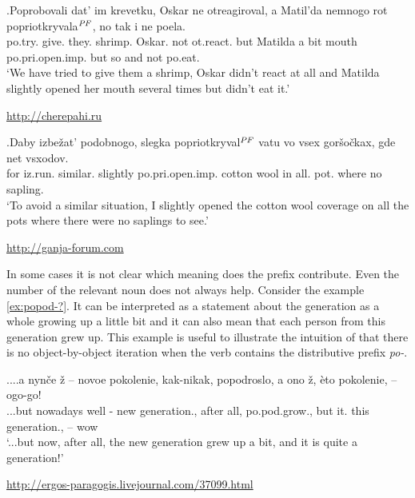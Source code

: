 \exg.\label{ex:popriotkryval:pf1}Poprobovali dat' im krevetku, Oskar ne otreagiroval, a Matil'da nemnogo rot popriotkryvala$^{\mathit{PF}}$, no tak i ne poela.\\
po.try. give. they. shrimp. Oskar. not ot.react. but Matilda {a bit} mouth po.pri.open.imp. but so and not po.eat.\\
\vspace{0.5em}
`We have tried to give them a shrimp, Oskar didn't react at all and Matilda slightly opened her mouth several times but didn't eat it.'
\begin{flushright}
\vspace{-0.5em}
\url{http://cherepahi.ru}
\end{flushright}

\exg.\label{ex:popriotkryval:pf2}Daby izbe\v{z}at' podobnogo, slegka popriotkryval$^{\mathit{PF}}$ vatu vo vsex gor\v{s}o\v{c}kax, gde net vsxodov.\\
for iz.run. similar. slightly po.pri.open.imp. {cotton wool} in all. pot. where no sapling.\\
\vspace{0.5em}
`To avoid a similar situation, I slightly opened the cotton wool coverage on all the pots where there were no saplings to see.'
\begin{flushright}
\vspace{-0.5em}
\url{http://ganja-forum.com}
\end{flushright}

In some cases it is not clear which meaning does the prefix contribute. Even the number of the relevant noun does not always help. Consider the example \ref{ex:popod-?}. It can be interpreted as a statement about the generation as a whole growing up a little bit and it can also mean that each person from this generation grew up. This example is useful to illustrate the intuition of \citet{Isachenko:60} that there is no object-by-object iteration when the verb contains the distributive prefix \textit{po-}.

\exg.\label{ex:popod-?}...a nyn\v{c}e \v{z} – novoe pokolenie, kak-nikak, popodroslo, a ono \v{z}, \`{e}to pokolenie, -- ogo-go!\\
...but nowadays well - new generation., {after all}, po.pod.grow., but it. {} this generation., -- wow
\\
\vspace{0.5em}
`...but now, after all, the new generation grew up a bit, and it is quite a generation!'
\begin{flushright}
\vspace{-0.5em}
\url{http://ergos-paragogis.livejournal.com/37099.html}
\end{flushright}
 
